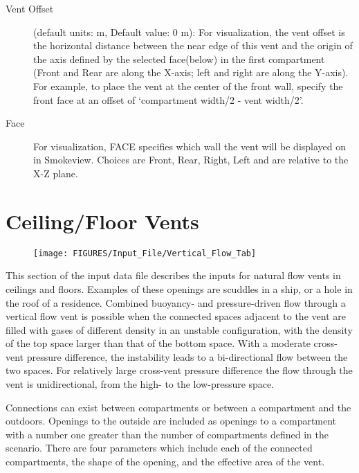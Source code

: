 \begin{description}
\item[Vent Offset] (default units: m, Default value: 0 m): For visualization, the vent offset is the horizontal distance between the near edge of this vent and the origin of the axis defined by the selected face(below) in the first compartment (Front and Rear are along the X-axis; left and right are along the Y-axis). For example, to place the vent at the center of the front wall, specify the front face at an offset of `compartment width/2 - vent width/2'.

\item[Face] For visualization, FACE specifies which wall the vent will be displayed on in Smokeview.  Choices are Front, Rear, Right, Left and are relative to the X-Z plane.
\end{description}


\section{Ceiling/Floor Vents}

\begin{figure}[h!]
\texttt{[image: FIGURES/Input\_File/Vertical\_Flow\_Tab]}
\end{figure}

This section of the input data file describes the inputs for natural flow vents in ceilings and floors. Examples of these openings are scuddles in a ship, or a hole in the roof of a residence. Combined buoyancy- and pressure-driven flow through a vertical flow vent is possible when the connected spaces adjacent to the vent are filled with gases of different density in an unstable configuration, with the density of the top space larger than that of the bottom space. With a moderate cross-vent pressure difference, the instability leads to a bi-directional flow between the two spaces. For relatively large cross-vent pressure difference the flow through the vent is unidirectional, from the high- to the low-pressure space.

Connections can exist between compartments or between a compartment and the outdoors. Openings to the outside are included as openings to a compartment with a number one greater than the number of compartments defined in the scenario. There are four parameters which include each of the connected compartments, the shape of the opening, and the effective area of the vent.

